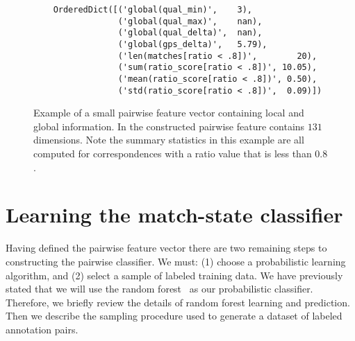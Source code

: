 \begin{figure}
\begin{verbatim}
    OrderedDict([('global(qual_min)',    3),
                 ('global(qual_max)',    nan),
                 ('global(qual_delta)',  nan),
                 ('global(gps_delta)',   5.79),
                 ('len(matches[ratio < .8])',        20),
                 ('sum(ratio_score[ratio < .8])', 10.05),
                 ('mean(ratio_score[ratio < .8])', 0.50),
                 ('std(ratio_score[ratio < .8])',  0.09)])
\end{verbatim}
\caption[A pairwise feature vector]{ %
Example of a small pairwise feature vector containing local and global information.
In the constructed pairwise feature contains $131$ dimensions.
Note the summary statistics in this example are all computed for correspondences with a ratio value that is less
  than $0.8$.
}
\label{fig:PairFeatVec}
\end{figure}



\section{Learning the match-state classifier}\label{sec:learnclf}

    Having defined the pairwise feature vector there are two remaining steps to constructing the pairwise
      classifier.
    We must:
    (1) choose a probabilistic learning algorithm, and
    (2) select a sample of labeled training data.
    We have previously stated that we will use the random forest~\cite{breiman_random_2001} as our probabilistic
      classifier.
    Therefore, we briefly review the details of random forest learning and prediction.
    Then we describe the sampling procedure used to generate a dataset of labeled annotation pairs.

